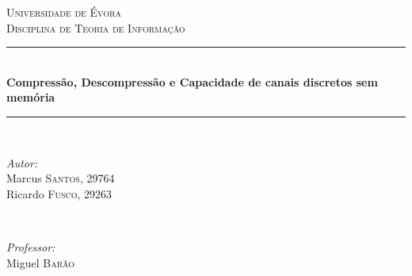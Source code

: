 \begin{titlepage}

\newcommand{\HRule}{\rule{\linewidth}{0.5mm}} %

\center %
 

\textsc{\LARGE Universidade de Évora}\\[1.5cm] %
\textsc{\Large Disciplina de Teoria de Informação}\\[0.5cm] %


\HRule \\[0.4cm]
{ \huge \bfseries Compressão, Descompressão e Capacidade de canais discretos sem memória}\\[0.4cm] %
\HRule \\[1.5cm]
 

\begin{minipage}{0.4\textwidth}
\begin{flushleft} \large
\emph{Autor:}\\
Marcus \textsc{Santos}, 29764\\
Ricardo \textsc{Fusco}, 29263
\end{flushleft}
\end{minipage}
~
\begin{minipage}{0.4\textwidth}
\begin{flushright} \large
\emph{Professor:} \\
Miguel \textsc{Barão}
\end{flushright}
\end{minipage}\\[2cm]


\end{titlepage}
